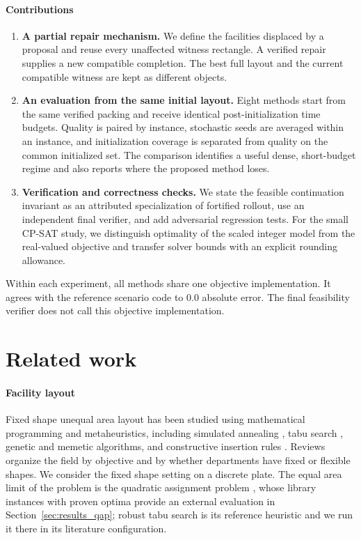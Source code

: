 \documentclass[preprint,12pt,authoryear]{elsarticle}
\begin{document}
\paragraph{Contributions}
\begin{enumerate}
\item \textbf{A partial repair mechanism.} We define the facilities displaced
by a proposal and reuse every unaffected witness rectangle. A verified repair
supplies a new compatible completion. The best full layout and the current
compatible witness are kept as different objects.

\item \textbf{An evaluation from the same initial layout.} Eight methods start from the same
verified packing and receive identical post-initialization time budgets. Quality
is paired by instance, stochastic seeds are averaged within an instance, and
initialization coverage is separated from quality on the common initialized set.
The comparison identifies a useful dense, short-budget regime and also reports
where the proposed method loses.

\item \textbf{Verification and correctness checks.} We state the feasible
continuation invariant as an attributed specialization of fortified rollout,
use an independent final verifier, and add adversarial regression tests. For the
small CP-SAT study, we distinguish optimality of the scaled integer model from
the real-valued objective and transfer solver bounds with an explicit rounding
allowance.
\end{enumerate}

Within each experiment, all methods share one objective implementation. It
agrees with the reference scenario code to $0.0$ absolute error. The final
feasibility verifier does not call this objective implementation.

\section{Related work}
\label{sec:related}

\paragraph{Facility layout}
Fixed shape unequal area layout has been studied using mathematical programming
and metaheuristics, including simulated annealing \citep{Kirkpatrick1983SA},
tabu search \citep{Glover1989Tabu}, genetic and memetic algorithms, and
constructive insertion rules \citep{gomes2000metaheuristic,Drira2007,singh2006review}.
Reviews \citep{perez2021facility,csahin2020mathematical} organize the field by
objective and by whether departments have fixed or flexible shapes. We consider
the fixed shape setting on a discrete plate. The equal area limit of the problem is the
quadratic assignment problem \citep{Koopmans1957QAP}, whose library instances
with proven optima \citep{Burkard1997QAPLIB} provide an external evaluation in
Section~\ref{sec:results_qap}; robust tabu search \citep{Taillard1991Robust} is
its reference heuristic and we run it there in its literature configuration.
\end{document}
